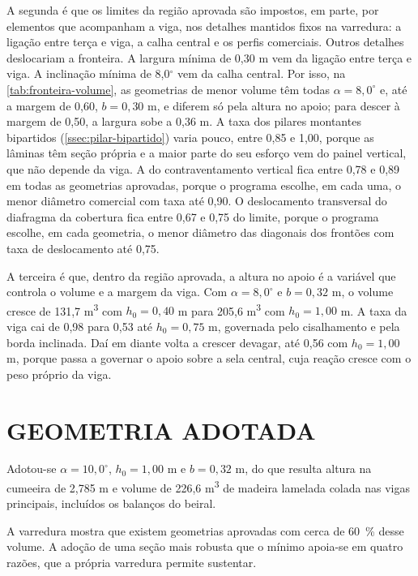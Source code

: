 A segunda é que os limites da região aprovada são impostos, em parte, por
elementos que acompanham a viga, nos detalhes mantidos fixos na varredura: a
ligação entre terça e viga, a calha central e os perfis comerciais. Outros
detalhes deslocariam a fronteira. A largura mínima de 0,30 m vem da ligação
entre terça e viga. A inclinação
mínima de 8,0$^{\circ}$ vem da calha central. Por isso, na \autoref{tab:fronteira-volume},
as geometrias de menor volume têm todas $\alpha = 8{,}0^{\circ}$ e, até a margem
de 0,60, $b = 0{,}30$ m, e diferem só pela altura no apoio; para descer à margem de
0,50, a largura sobe a 0,36 m. A taxa dos pilares montantes bipartidos
(\autoref{ssec:pilar-bipartido}) varia pouco, entre 0,85 e 1,00, porque as
lâminas têm seção própria e a maior parte do seu esforço vem do painel vertical,
que não depende da viga. A do
contraventamento vertical fica entre 0,78 e 0,89 em todas as geometrias aprovadas,
porque o programa escolhe, em cada uma, o menor diâmetro comercial com taxa até
0,90. O deslocamento transversal do diafragma da cobertura fica entre 0,67 e 0,75
do limite, porque o programa escolhe, em cada geometria, o menor diâmetro das
diagonais dos frontões com taxa de deslocamento até 0,75.

A terceira é que, dentro da região aprovada, a altura no apoio é a variável que
controla o volume e a margem da viga. Com $\alpha = 8{,}0^{\circ}$ e
$b = 0{,}32$ m, o volume cresce de 131,7 m\textsuperscript{3} com $h_0 = 0{,}40$ m
para 205,6 m\textsuperscript{3} com $h_0 = 1{,}00$ m. A taxa da viga cai de 0,98
para 0,53 até $h_0 = 0{,}75$ m, governada pelo cisalhamento e pela borda
inclinada. Daí em diante volta a crescer devagar, até 0,56 com $h_0 = 1{,}00$ m,
porque passa a governar o apoio sobre a sela central, cuja reação cresce com o
peso próprio da viga.

\section{GEOMETRIA ADOTADA}\label{sec:geometria-adotada}

Adotou-se $\alpha = 10{,}0^{\circ}$, $h_0 = 1{,}00$ m e $b = 0{,}32$ m, do que resulta
altura na cumeeira de 2,785 m e volume de 226,6 m\textsuperscript{3} de madeira
lamelada colada nas vigas principais, incluídos os balanços do beiral.

A varredura mostra que existem geometrias aprovadas com cerca de 60~\% desse
volume. A adoção de uma seção mais robusta que o mínimo apoia-se em quatro
razões, que a própria varredura permite sustentar.


